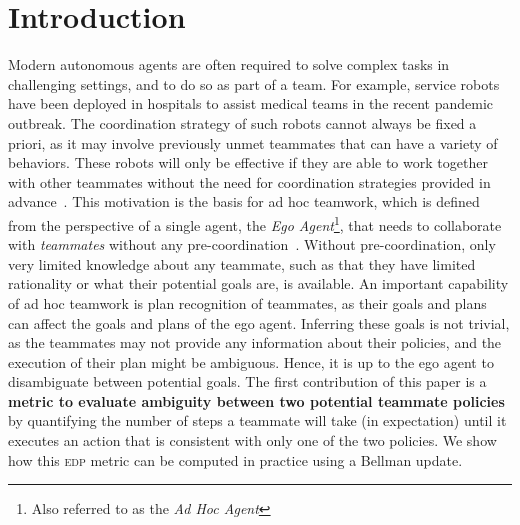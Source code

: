 \documentclass[letterpaper]{article}
\begin{document}
\section{Introduction}
Modern autonomous agents are often required to solve complex tasks in challenging settings, and to do so as part of a team. For example, service robots have been deployed in hospitals to assist medical teams in the recent pandemic outbreak. The coordination strategy of such robots cannot always be fixed a priori, as it may involve previously unmet teammates that can have a variety of behaviors. %
These robots will only be effective if they are able to work together with other teammates without the need for coordination strategies provided in advance~\cite{cakmak2012designing}.
This motivation is the basis for ad hoc teamwork, which is defined from the perspective of a single agent, the \emph{Ego Agent}\footnote{Also referred to as the \emph{Ad Hoc Agent}}, that needs to collaborate with \emph{teammates} without any pre-coordination~\cite{stone2010ad,albrecht2018autonomous}. Without pre-coordination, only very limited knowledge about any teammate, such as that they have limited rationality or what their potential goals are, is available.
An important capability of ad hoc teamwork is plan recognition of teammates, as their goals and plans can affect the goals and plans of the ego agent.
Inferring these goals is not trivial, as the teammates may not provide any information about their policies, and the execution of their plan might be ambiguous. Hence, it is up to the ego agent to disambiguate between potential goals.
The first contribution of this paper is a \textbf{metric to evaluate ambiguity between two potential teammate policies} by quantifying the number of steps a teammate will take (in expectation) until it executes an action that is consistent with only one of the two policies. 
We show how this \textsc{edp} metric can be computed in practice using a Bellman update.
\end{document}
